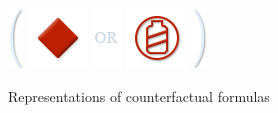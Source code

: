 \documentclass[a4paper,american,10pt]{paper}
\theoremstyle{definition}\newtheorem{lemma}[thm]{Lemma}
\theoremstyle{definition}\newtheorem{proposition}[thm]{Proposition}
\theoremstyle{definition}\newtheorem{corollary}[thm]{Corollary}
\theoremstyle{definition}\newtheorem{definition}{Definition}
\begin{document}
\begin{figure}[H]
{{\includegraphics{BO_Thin}
\includegraphics{Atom}
\includegraphics{OR}
\includegraphics{Tank_Empty}
\includegraphics{BC_Thin}}
}
\caption{Representations of counterfactual formulas}
\label{fig:icon_formulas}
\end{figure}
\newpage
\end{document}
